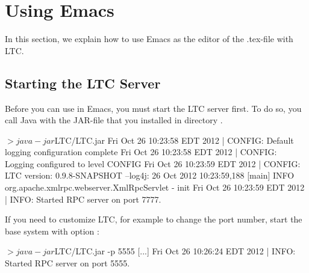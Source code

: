 \section{Using Emacs} \label{sec:emacs}

In this section, we explain how to use Emacs as the editor of the .tex-file with LTC.

\begin{center}
\end{center}

\subsection{Starting the LTC Server}

Before you can use  in Emacs, you must start the LTC server first.  To do so, you call Java with the JAR-file that you installed in directory . 

\begin{CodeVerbatim}
$> java -jar $LTC/LTC.jar 
Fri Oct 26 10:23:58 EDT 2012 | CONFIG: 	Default logging configuration complete
Fri Oct 26 10:23:58 EDT 2012 | CONFIG: 	Logging configured to level CONFIG
Fri Oct 26 10:23:59 EDT 2012 | CONFIG: 	LTC version: 0.9.8-SNAPSHOT
--log4j: 26 Oct 2012 10:23:59,188 [main] INFO  org.apache.xmlrpc.webserver.XmlRpcServlet - init
Fri Oct 26 10:23:59 EDT 2012 | INFO: 	Started RPC server on port 7777.
\end{CodeVerbatim}

If you need to customize LTC, for example to change the port number, start the base system with option :

\begin{CodeVerbatim}
$> java -jar $LTC/LTC.jar -p 5555
[...]
Fri Oct 26 10:26:24 EDT 2012 | INFO: 	Started RPC server on port 5555.
\end{CodeVerbatim}

